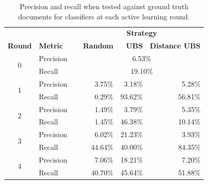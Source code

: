 \begin{table}[ht!]
\centering
\caption{Precision and recall when tested against ground truth documents for classifiers at each active learning round.\label{tab:pr_table}
}
\vspace{2ex}
\setlength\tabcolsep{6pt}
\begin{tabular}{|c| l | r | r | r |}
\hline
& & \multicolumn{3}{c|}{\textbf{Strategy}} \\
 \textbf{Round} & \textbf{Metric} & \textbf{Random} & \textbf{UBS}  & \textbf{Distance UBS}  \\
\hline
\multirow{2}{*}{0} & Precision &        \multicolumn{3}{c|}{6.53\%} \\
 & Recall\ \ \ \ \ &               \multicolumn{3}{c|}{19.10\%} \\
\hline
\multirow{2}{*}{1}  & Precision     & 3.75\%       &      3.18\%      &  5.28\% \\
 & Recall\ \ \ \ \ & 0.29\%      &   93.62\%     &  56.81\% \\
\hline
\multirow{2}{*}{2} & Precision      & 1.49\%           &      3.79\%      &  5.35\% \\
& Recall\ \ \ \ \ & 1.45\%           &    46.38\%      &  10.14\% \\
\hline
\multirow{2}{*}{3}  & Precision      & 6.02\%              &    21.23\%      &  3.93\% \\
 & Recall\ \ \ \ \ & 44.64\%            &    40.00\%      &  84.35\%  \\
\hline
\multirow{2}{*}{4} & Precision     & 7.06\%          &    18.21\%      &  7.20\% \\
& Recall\ \ \ \ \ & 40.70\%         &     45.64\%     &  51.88\% \\
\hline
\end{tabular}
\end{table}


